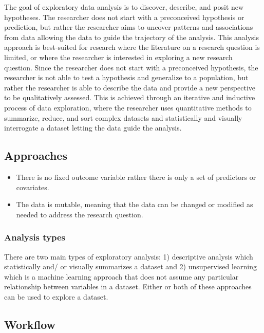 \documentclass[
  letterpaper,
]{scrbook}
\providecommand{\tightlist}{%
  \setlength{\itemsep}{0pt}\setlength{\parskip}{0pt}}\usepackage{longtable,booktabs,array}
\begin{document}
The goal of exploratory data analysis is to discover, describe, and
posit new hypotheses. The researcher does not start with a preconceived
hypothesis or prediction, but rather the researcher aims to uncover
patterns and associations from data allowing the data to guide the
trajectory of the analysis. This analysis approach is best-suited for
research where the literature on a research question is limited, or
where the researcher is interested in exploring a new research question.
Since the researcher does not start with a preconceived hypothesis, the
researcher is not able to test a hypothesis and generalize to a
population, but rather the researcher is able to describe the data and
provide a new perspective to be qualitatively assessed. This is achieved
through an iterative and inductive process of data exploration, where
the researcher uses quantitative methods to summarize, reduce, and sort
complex datasets and statistically and visually interrogate a dataset
letting the data guide the analysis.

\hypertarget{eda-approaches}{%
\subsection{Approaches}\label{eda-approaches}}

\begin{itemize}
\tightlist
\item
  There is no fixed outcome variable rather there is only a set of
  predictors or covariates.
\item
  The data is mutable, meaning that the data can be changed or modified
  as needed to address the research question.
\end{itemize}

\hypertarget{eda-analysis-types}{%
\subsubsection{Analysis types}\label{eda-analysis-types}}

There are two main types of exploratory analysis: 1) descriptive
analysis which statistically and/ or visually summarizes a dataset and
2) unsupervised learning which is a machine learning approach that does
not assume any particular relationship between variables in a dataset.
Either or both of these approaches can be used to explore a dataset.

\hypertarget{eda-workflow}{%
\subsection{Workflow}\label{eda-workflow}}
\end{document}
